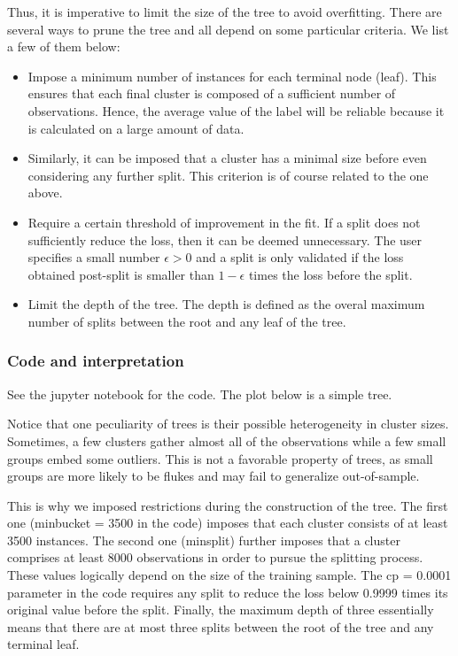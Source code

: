 Thus, it is imperative to limit the size of the tree to avoid overfitting. There are several ways to prune the tree and all depend on some particular criteria. We list a few of them below:
\begin{itemize}
    \item Impose a minimum number of instances for each terminal node (leaf). This ensures that each final cluster is composed of a sufficient number of observations. Hence, the average value of the label will be reliable because it is calculated on a large amount of data.
    \item Similarly, it can be imposed that a cluster has a minimal size before even considering any further split. This criterion is of course related to the one above.
    \item Require a certain threshold of improvement in the fit. If a split does not sufficiently reduce the loss, then it can be deemed unnecessary. The user specifies a small number $\epsilon > 0$ and a split is only validated if the loss obtained post-split is smaller than $1-\epsilon $ times the loss before the split.
    \item Limit the depth of the tree. The depth is defined as the overal maximum number of splits between the root and any leaf of the tree.
\end{itemize}

\subsubsection{Code and interpretation}
See the jupyter notebook for the code. The plot below is a simple tree.

Notice that one peculiarity of trees is their possible heterogeneity in cluster sizes. Sometimes, a few clusters gather almost all of the observations while a few small groups embed some outliers. This is not a favorable property of trees, as small groups are more likely to be flukes and may fail to generalize out-of-sample.

This is why we imposed restrictions during the construction of the tree. The first one (minbucket = 3500 in the code) imposes that each cluster consists of at least 3500 instances. The second one (minsplit) further imposes that a cluster comprises at least 8000 observations in order to pursue the splitting process. These values logically depend on the size of the training sample. The cp = 0.0001 parameter in the code requires any split to reduce the loss below 0.9999 times its original value before the split. Finally, the maximum depth of three essentially means that there are at most three splits between the root of the tree and any terminal leaf.

